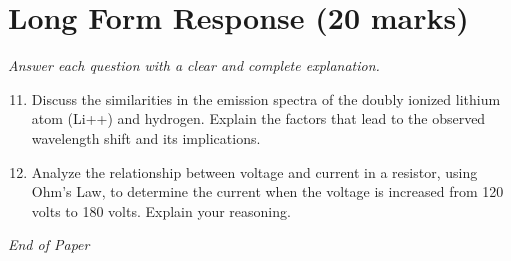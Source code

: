 \documentclass[12pt]{article}
\begin{document}
\section*{Long Form Response (20 marks)}
\textit{Answer each question with a clear and complete explanation.}
\begin{enumerate}[label=\arabic*.]
\setcounter{enumi}{10}
\item Discuss the similarities in the emission spectra of the doubly ionized lithium atom (Li++) and hydrogen. Explain the factors that lead to the observed wavelength shift and its implications.
\item Analyze the relationship between voltage and current in a resistor, using Ohm's Law, to determine the current when the voltage is increased from 120 volts to 180 volts. Explain your reasoning.
\end{enumerate}

\vfill
\noindent\textit{End of Paper}
\end{document}
